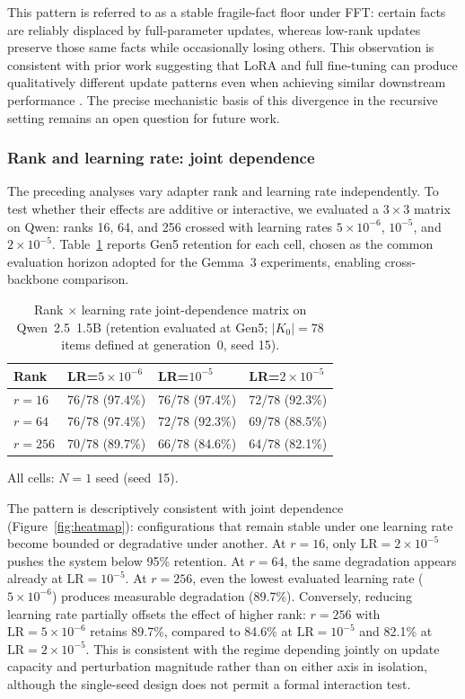 \documentclass[a4paper,fleqn]{cas-dc}
\newif\ifshowchanges
\newcommand{\rev}[1]{\ifshowchanges{\color{blue}#1}\else{#1}\fi}
\begin{document}
This pattern is referred to as a stable fragile-fact floor under FFT: certain facts
are reliably displaced by full-parameter updates, whereas low-rank updates
preserve those same facts while occasionally losing others. This observation is
consistent with prior work suggesting that LoRA and full fine-tuning can produce
qualitatively different update patterns even when achieving similar downstream
performance \citep{shuttleworth2024illusion,biderman2024}. The precise
mechanistic basis of this divergence in the recursive setting remains an open
question for future work.

\subsubsection{\rev{Rank and learning rate: joint dependence}}

The preceding analyses vary adapter rank and learning rate independently. To
test whether their effects are additive or interactive, we evaluated a
$3 \times 3$ matrix on Qwen: ranks 16, 64, and 256 crossed with learning rates
$5 \times 10^{-6}$, $10^{-5}$, and $2 \times 10^{-5}$. Table~\ref{tab:ranklr}
reports Gen5 retention for each cell, chosen as the common evaluation horizon
adopted for the Gemma~3 experiments, enabling cross-backbone comparison.

\begin{table}[width=.95\linewidth,cols=4,pos=htbp]
\caption{Rank $\times$ learning rate joint-dependence matrix on Qwen~2.5~1.5B
(retention evaluated at Gen5; $\rev{\lvert K_0\rvert = 78}$ items defined at generation~0, seed 15).}\label{tab:ranklr}
\begin{tabular*}{\tblwidth}{@{} llll@{} }
\toprule
Rank & LR=$5{\times}10^{-6}$ & LR=$10^{-5}$ & LR=$2{\times}10^{-5}$ \\
\midrule
$r=16$  & 76/78 (97.4\%) & 76/78 (97.4\%) & 72/78 (92.3\%) \\
$r=64$  & 76/78 (97.4\%) & 72/78 (92.3\%) & 69/78 (88.5\%) \\
$r=256$ & 70/78 (89.7\%) & 66/78 (84.6\%) & 64/78 (82.1\%) \\
\bottomrule
\end{tabular*}
\rev{{\footnotesize All cells: $N=1$ seed (seed~15).}}
\end{table}

\rev{The pattern is descriptively consistent with joint dependence} (Figure~\ref{fig:heatmap}): configurations that remain stable under one
learning rate become bounded or degradative under another. At $r=16$, only
$\mathrm{LR}=2 \times 10^{-5}$ pushes the system below 95\% retention. At
$r=64$, the same degradation appears already at $\mathrm{LR}=10^{-5}$. At
$r=256$, even the lowest evaluated learning rate ($5 \times 10^{-6}$) produces
measurable degradation (89.7\%). Conversely, reducing learning rate partially
offsets the effect of higher rank: $r=256$ with $\mathrm{LR}=5 \times 10^{-6}$
retains 89.7\%, compared to 84.6\% at $\mathrm{LR}=10^{-5}$ and 82.1\% at
$\mathrm{LR}=2 \times 10^{-5}$. This \rev{is consistent with the regime depending jointly on update capacity and perturbation magnitude rather than on either axis in isolation, although the single-seed design does not permit a formal interaction test.}
\end{document}
